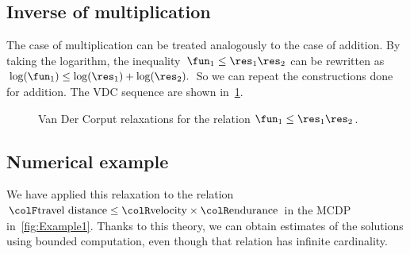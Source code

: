 \subsection{Inverse of multiplication}

The case of multiplication can be treated analogously to the case
of addition. By taking the logarithm, the inequality~$\fun_{1}\leq\res_{1}\res_{2}$
can be rewritten as~$\log(\fun_{1})\leq\log(\res_{1})+\log(\res_{2}).$
So we can repeat the constructions done for addition. The VDC sequence
are shown in~\cref{fig:approx_invmult}.

\begin{figure}[h]
\begin{centering}
\par\end{centering}
\caption{\label{fig:approx_invmult}Van Der Corput relaxations for the relation
$\fun_{1}\leq\res_{1}\res_{2}$.}
\end{figure}


\subsection{Numerical example}

We have applied this relaxation to the relation ${\colF\text{travel distance}}\leq{\colR\text{velocity}}\times{\colR\text{endurance}}$
in the MCDP in~\cref{fig:Example1}. Thanks to this theory,
we can obtain estimates of the solutions using bounded computation,
even though that relation has infinite cardinality.

